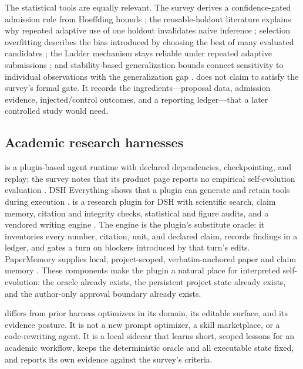 The statistical tools are equally relevant. The survey derives a confidence-gated admission rule from Hoeffding bounds \citep{hoeffding1963probability}; the reusable-holdout literature explains why repeated adaptive use of one holdout invalidates naive inference \citep{dwork2015reusable}; selection overfitting describes the bias introduced by choosing the best of many evaluated candidates \citep{cawley2010overfitting}; the Ladder mechanism stays reliable under repeated adaptive submissions \citep{blum2015ladder}; and stability-based generalization bounds connect sensitivity to individual observations with the generalization gap \citep{shalev2010learnability,hardt2016train}. \system{} does not claim to satisfy the survey's formal gate. It records the ingredients---proposal data, admission evidence, injected/control outcomes, and a reporting ledger---that a later controlled study would need.

\subsection{Academic research harnesses}
\dsh{} is a plugin-based agent runtime with declared dependencies, checkpointing, and replay; the survey notes that its product page reports no empirical self-evolution evaluation \citep{deepseek2026harness,wei2026harnessrsi}. DSH Everything shows that a plugin can generate and retain tools during execution \citep{shen2026dsheverything}. \ah{} is a research plugin for DSH with scientific search, claim memory, citation and integrity checks, statistical and figure audits, and a vendored writing engine \citep{academicharness2026}. The engine is the plugin's substitute oracle: it inventories every number, citation, unit, and declared claim, records findings in a ledger, and gates a turn on blockers introduced by that turn's edits. PaperMemory supplies local, project-scoped, verbatim-anchored paper and claim memory \citep{papermemory2026}. These components make the plugin a natural place for interpreted self-evolution: the oracle already exists, the persistent project state already exists, and the author-only approval boundary already exists.

\system{} differs from prior harness optimizers in its domain, its editable surface, and its evidence posture. It is not a new prompt optimizer, a skill marketplace, or a code-rewriting agent. It is a local sidecar that learns short, scoped lessons for an academic workflow, keeps the deterministic oracle and all executable state fixed, and reports its own evidence against the survey's criteria.
